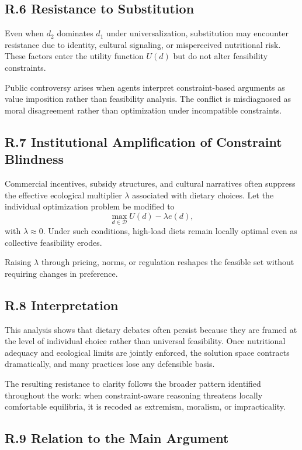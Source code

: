 \documentclass[11pt]{article}
\begin{document}
\subsection{R.6 Resistance to Substitution}

Even when \(d_2\) dominates \(d_1\) under universalization, substitution may encounter resistance due to identity, cultural signaling, or misperceived nutritional risk. These factors enter the utility function \(U(d)\) but do not alter feasibility constraints.

Public controversy arises when agents interpret constraint-based arguments as value imposition rather than feasibility analysis. The conflict is misdiagnosed as moral disagreement rather than optimization under incompatible constraints.

\subsection{R.7 Institutional Amplification of Constraint Blindness}

Commercial incentives, subsidy structures, and cultural narratives often suppress the effective ecological multiplier \(\lambda\) associated with dietary choices. Let the individual optimization problem be modified to
\[
\max_{d \in \mathcal{D}} U(d) - \lambda e(d),
\]
with \(\lambda \approx 0\). Under such conditions, high-load diets remain locally optimal even as collective feasibility erodes.

Raising \(\lambda\) through pricing, norms, or regulation reshapes the feasible set without requiring changes in preference.

\subsection{R.8 Interpretation}

This analysis shows that dietary debates often persist because they are framed at the level of individual choice rather than universal feasibility. Once nutritional adequacy and ecological limits are jointly enforced, the solution space contracts dramatically, and many practices lose any defensible basis.

The resulting resistance to clarity follows the broader pattern identified throughout the work: when constraint-aware reasoning threatens locally comfortable equilibria, it is recoded as extremism, moralism, or impracticality.

\subsection{R.9 Relation to the Main Argument}
\end{document}
